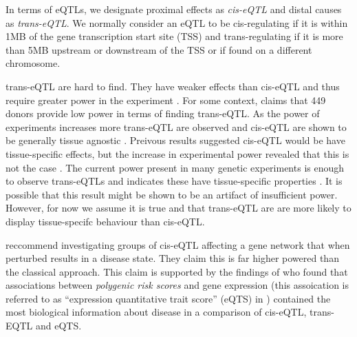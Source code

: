 \documentclass[a4paper,10pt]{article}
\begin{document}
In terms of eQTLs, we designate proximal effects as \emph{cis-eQTL} and distal causes as 
\emph{trans-eQTL}. We normally consider an eQTL to be cis-regulating if it is within 1MB of the 
gene transcription start site (TSS) and trans-regulating if it is more than 5MB upstream or 
downstream of the TSS or if found on a different chromosome.

trans-eQTL are hard to find. They have weaker effects than cis-eQTL and thus require greater power 
in the experiment \cite{dixon2007genome}. For some context, \citet{burgess2010principles} claims 
that 449 donors provide low power in terms of finding trans-eQTL. As the power of experiments increases 
more trans-eQTL are observed and cis-eQTL are shown to be generally tissue agnostic 
\cite{gtex2017genetic}. Preivous results suggested cis-eQTL would be have tissue-specific effects, 
but the increase in experimental power revealed that this is not the case \cite{grundberg2012mapping}. 
The current power present in many genetic experiments is enough to observe trans-eQTLs and indicates 
these have tissue-specific properties \cite{grundberg2012mapping} \cite{gtex2017genetic}. It is 
possible that this result might be shown to be an artifact of insufficient power. However, for now 
we assume it is true and that trans-eQTL are are more likely to display tissue-specifc behaviour 
than cis-eQTL.

\citet{nica2013expression} reccommend investigating groups of cis-eQTL affecting a gene network that 
when perturbed results in a disease state. They claim this is far higher powered than the classical 
approach. This claim is supported by the findings of \citet{vosa2018unraveling} who found that 
associations between \emph{polygenic risk scores} and gene expression (this assoication is referred 
to as ``expression quantitative trait score'' (eQTS) in \cite{vosa2018unraveling}) contained the 
most biological information about disease in a comparison of cis-eQTL, trans-EQTL and eQTS.



\end{document}
